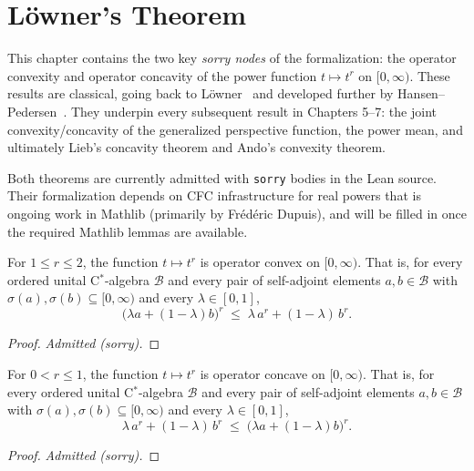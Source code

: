 \chapter{L\"{o}wner's Theorem}

This chapter contains the two key \emph{sorry nodes} of the formalization: the operator
convexity and operator concavity of the power function $t \mapsto t^r$ on $[0, \infty)$.
These results are classical, going back to L\"{o}wner~\cite{Loewner1934} and developed
further by Hansen--Pedersen~\cite{HansenPedersen1982}.  They underpin every subsequent
result in Chapters 5--7: the joint convexity/concavity of the generalized perspective
function, the power mean, and ultimately Lieb's concavity theorem and Ando's convexity
theorem.

Both theorems are currently admitted with \texttt{sorry} bodies in the Lean source.
Their formalization depends on CFC infrastructure for real powers that is ongoing work
in Mathlib (primarily by Fr\'{e}d\'{e}ric Dupuis), and will be filled in once the
required Mathlib lemmas are available.

\begin{theorem}
  \label{thm:loewner_convex}
  \leanok
  For $1 \leq r \leq 2$, the function $t \mapsto t^r$ is operator convex on
  $[0, \infty)$.  That is, for every ordered unital C$^*$-algebra $\mathcal{B}$ and
  every pair of self-adjoint elements $a, b \in \mathcal{B}$ with
  $\sigma(a), \sigma(b) \subseteq [0, \infty)$ and every $\lambda \in [0, 1]$,
  \[
    \bigl(\lambda a + (1 - \lambda) b\bigr)^r
    \;\leq\;
    \lambda\, a^r + (1 - \lambda)\, b^r.
  \]
  \begin{proof}
    \emph{Admitted (sorry).}
  \end{proof}
\end{theorem}

\begin{theorem}
  \label{thm:loewner_concave}
  \leanok
  For $0 < r \leq 1$, the function $t \mapsto t^r$ is operator concave on
  $[0, \infty)$.  That is, for every ordered unital C$^*$-algebra $\mathcal{B}$ and
  every pair of self-adjoint elements $a, b \in \mathcal{B}$ with
  $\sigma(a), \sigma(b) \subseteq [0, \infty)$ and every $\lambda \in [0, 1]$,
  \[
    \lambda\, a^r + (1 - \lambda)\, b^r
    \;\leq\;
    \bigl(\lambda a + (1 - \lambda) b\bigr)^r.
  \]
  \begin{proof}
    \emph{Admitted (sorry).}
  \end{proof}
\end{theorem}
